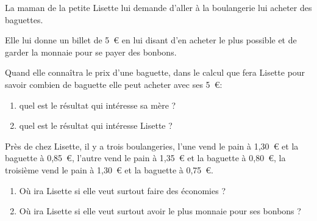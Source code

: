 La maman de la petite Lisette lui demande d'aller à la boulangerie lui
acheter des baguettes.
\par Elle lui donne un billet de 5~\textgreek{\euro} en lui disant d'en acheter le plus possible et de garder la monnaie pour se payer des bonbons.
\begin{myenumerate}
  \item Quand elle connaîtra le prix d'une baguette, dans le calcul
    que fera Lisette pour savoir combien de baguette elle peut acheter
    avec ses 5~\textgreek{\euro}:
    \begin{enumerate}
    \item quel est le résultat qui intéresse sa mère ?
    \item quel est le résultat qui intéresse Lisette ?
    \end{enumerate}
  \item Près de chez Lisette, il y a trois boulangeries, l'une vend le
    pain à 1,30~\textgreek{\euro} et la baguette à
    0,85~\textgreek{\euro}, l'autre vend le pain à
    1,35~\textgreek{\euro} et la baguette à 0,80~\textgreek{\euro}, la
    troisième vend le pain à 1,30~\textgreek{\euro} et la baguette à 0,75~\textgreek{\euro}.
    \begin{enumerate}
    \item Où ira Lisette si elle veut surtout faire des économies ?
    \item Où ira Lisette si elle veut surtout avoir le plus monnaie
      pour ses bonbons ?
    \end{enumerate}
\end{myenumerate}

